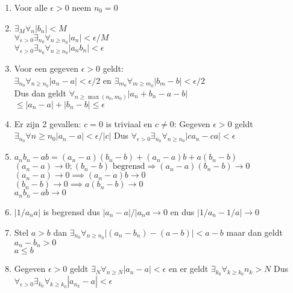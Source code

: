 \begin{enumerate}[label=\roman*)]
	\item{
		Voor alle $\epsilon>0$ neem $n_0=0$
	}
	\item{
		$\exists_M\forall_n\left|b_n\right|<M$\\
		$\forall_{\epsilon>0}\exists_{n_0}\forall_{n\geq n_0}\left|a_n\right|<\epsilon/M$\\
		$\forall_{\epsilon>0}\exists_{n_0}\forall_{n\geq n_0}\left|a_nb_n\right|<\epsilon$
	}
	\item{
		Voor een gegeven $\epsilon>0$ geldt:\\
		$\exists_{n_0}\forall_{n\geq n_0}|a_n-a|<\epsilon/2$ en $\exists_{m_0}\forall_{m\geq m_0}|b_m-b|<\epsilon/2$\\
		Dus dan geldt $\forall_{n\geq\max(n_0,m_0)}|a_n+b_n-a-b|$\\$\leq|a_n-a|+|b_n-b|\leq\epsilon$
	}
	\item{
		Er zijn 2 gevallen: $c=0$ is triviaal en $c\neq0$:
		Gegeven $\epsilon>0$ geldt $\exists_{n_0}\forall{n\geq n_0}|a_n-a|<\epsilon/|c|$
		Dus $\forall_{\epsilon>0}\exists_{n_0}\forall_{n\geq n_0}|ca_n-ca|<\epsilon$
	}
	\item{
		$a_nb_n-ab=(a_n-a)(b_n-b)+(a_n-a)b+a(b_n-b)$\\
		$(a_n-a)\to0;(b_n-b)\text{ begrensd}\Rightarrow(a_n-a)(b_n-b)\to0$\\
		$(a_n-a)\to0\implies(a_n-a)b\to0$\\
		$(b_n-b)\to0\implies a(b_n-b)\to0$\\
		$a_nb_n-ab\to0$
	}
	\item{
		$|1/a_na|$ is begrensd dus $|a_n-a|/|a_na\to0$ en dus $|1/a_n-1/a|\to0$
	}
	\item{
		Stel $a>b$ dan $\exists_{n_0}\forall_{n\geq n_0}|(a_n-b_n)-(a-b)|<a-b$ maar dan geldt $a_n-b_n>0$ \lightning\\
		$a\leq b$
	}
	\item{
		Gegeven $\epsilon>0$ geldt $\exists_{N}\forall_{n\geq N}|a_n-a|<\epsilon$ en er geldt $\exists_{k_0}\forall_{k\geq k_0}n_k>N$
		Dus $\forall_{\epsilon>0}\exists_{k_0}\forall_{k\geq k_0}|a_{n_k}-a|<\epsilon$
	}
\end{enumerate}
